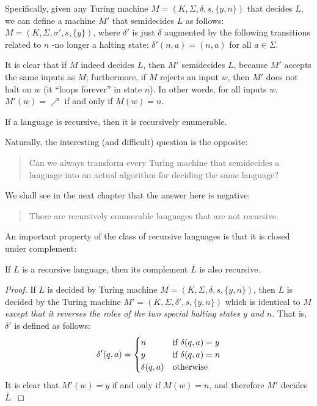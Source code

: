 Specifically, given any Turing machine $M = (K, \Sigma, \delta, s, \{y, n\})$ that decides $L$, we can define a machine $M'$ that semidecides $L$ as follows: $M = (K, \Sigma, \sigma', s, \{y\})$, where $\delta'$ is just $\delta$ augmented by the following transitions related to $n$ -no longer 
a halting state: $\delta'(n, a) = (n, a)$ for all $a \in \Sigma$.

It is clear that if $M$ indeed decides $L$, then $M'$ semidecides $L$, because $M'$ accepts the same inputs as $M$; furthermore, if $M$ rejects an input $w$, then $M'$ does not halt on $w$ (it ``loops forever'' in state $n$). In other words, for all inputs $w$, $M'(w) = \nearrow$ if and only if $M(w) = n$.

\begin{theorem}{}
  If a language is recursive, then it is recursively enumerable.
\end{theorem}

Naturally, the interesting (and difficult) question is the opposite:
\begin{quote}
  Can we always transform every Turing machine that semidecides a language into an actual algorithm for deciding the same language?
\end{quote}
We shall see in the next chapter that the answer here is negative: 
\begin{quote}
  There are recursively enumerable languages that are not recursive.
\end{quote}

An important property of the class of recursive languages is that it is closed under complement: 
\begin{theorem}{}
  If $L$ is a recursive language, then its complement $\overline{L}$ is also recursive.
\end{theorem}

\vspace*{\fill}
\columnbreak

\begin{proof}
  If $L$ is decided by Turing machine $M = (K, \Sigma, \delta, s, \{y, n\})$, then $L$ is decided by the Turing machine $M' = (K, \Sigma, \delta', s, \{y, n\})$ which is identical to $M$ \textit{except that it reverses the roles of the two special halting states $y$ and $n$}. That is, $\delta'$ is defined as follows:
  \begin{equation*}
    \delta'(q, a) = 
      \begin{cases}
        n             &\textnormal{if } \delta(q, a) = y \\
        y             &\textnormal{if } \delta(q, a) = n \\
        \delta(q, a)  &\textnormal{otherwise}
      \end{cases}
  \end{equation*}
  It is clear that $M'(w) = y$ if and only if $M(w) = n$, and therefore $M'$ decides $\overline{L}$.
\end{proof}
